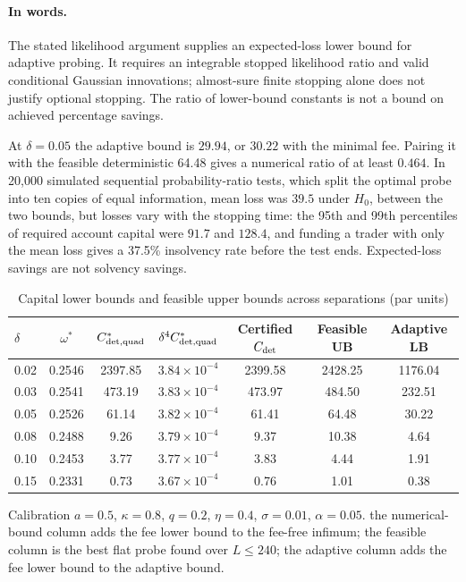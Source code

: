 \documentclass[12pt]{article}
\theoremstyle{definition}
\theoremstyle{remark}
\begin{document}
\paragraph{In words.} The stated likelihood argument supplies an expected-loss lower bound for adaptive probing. It requires an integrable stopped likelihood ratio and valid conditional Gaussian innovations; almost-sure finite stopping alone does not justify optional stopping. The ratio of lower-bound constants is not a bound on achieved percentage savings.

At $\delta=0.05$ the adaptive bound is $29.94$, or $30.22$ with the minimal fee. Pairing it with the feasible deterministic 64.48 gives a numerical ratio of at least $0.464$. In 20{,}000 simulated sequential probability-ratio tests, which split the optimal probe into ten copies of equal information, mean loss was $39.5$ under $H_0$, between the two bounds, but losses vary with the stopping time: the 95th and 99th percentiles of required account capital were $91.7$ and $128.4$, and funding a trader with only the mean loss gives a 37.5\% insolvency rate before the test ends. Expected-loss savings are not solvency savings.

\begin{table}[t]\centering\small
\begin{threeparttable}
\caption{Capital lower bounds and feasible upper bounds across separations (par units)}\label{tab:capbounds}
\begin{tabular}{lcccccc}
\toprule
$\delta$ & $\omega^*$ & $C^*_{\rm det,quad}$ & $\delta^4C^*_{\rm det,quad}$ & Certified $C_{\rm det}$ & Feasible UB & Adaptive LB\\
\midrule
0.02 & 0.2546 & 2397.85 & $3.84\times10^{-4}$ & 2399.58 & 2428.25 & 1176.04\\
0.03 & 0.2541 & 473.19 & $3.83\times10^{-4}$ & 473.97 & 484.50 & 232.51\\
0.05 & 0.2526 & 61.14 & $3.82\times10^{-4}$ & 61.41 & 64.48 & 30.22\\
0.08 & 0.2488 & 9.26 & $3.79\times10^{-4}$ & 9.37 & 10.38 & 4.64\\
0.10 & 0.2453 & 3.77 & $3.77\times10^{-4}$ & 3.83 & 4.44 & 1.91\\
0.15 & 0.2331 & 0.73 & $3.67\times10^{-4}$ & 0.76 & 1.01 & 0.38\\
\bottomrule
\end{tabular}
\begin{tablenotes}\footnotesize\item Calibration $a=0.5$, $\kappa=0.8$, $q=0.2$, $\eta=0.4$, $\sigma=0.01$, $\alpha=0.05$. the numerical-bound column adds the fee lower bound to the fee-free infimum; the feasible column is the best flat probe found over $L\le240$; the adaptive column adds the fee lower bound to the adaptive bound.\end{tablenotes}
\end{threeparttable}
\end{table}
\end{document}
